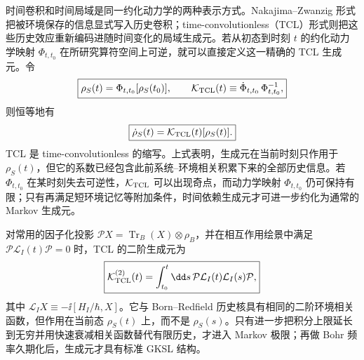 时间卷积和时间局域是同一约化动力学的两种表示方式。Nakajima--Zwanzig 形式把被环境保存的信息显式写入历史卷积；time-convolutionless（TCL）形式则把这些历史效应重新编码进随时间变化的局域生成元。若从初态到时刻 $t$ 的约化动力学映射 $\Phi_{t,t_0}$ 在所研究算符空间上可逆，就可以直接定义这一精确的 TCL 生成元。令
\begin{equation}
\boxed{
\rho_S(t)=\Phi_{t,t_0}[\rho_S(t_0)],
\qquad
\mathcal K_{\rm TCL}(t)
\equiv
\dot\Phi_{t,t_0}\,\Phi_{t,t_0}^{-1},}
\label{eq:exact_tcl_generator_definition}
\end{equation}
则恒等地有
\begin{equation}
\boxed{
\dot\rho_S(t)
=\mathcal K_{\rm TCL}(t)[\rho_S(t)].}
\label{eq:exact_tcl_master_equation}
\end{equation}
TCL 是 time-convolutionless 的缩写。上式表明，生成元在当前时刻只作用于 $\rho_S(t)$，但它的系数已经包含此前系统--环境相关积累下来的全部历史信息。若 $\Phi_{t,t_0}$ 在某时刻失去可逆性，$\mathcal K_{\rm TCL}$ 可以出现奇点，而动力学映射 $\Phi_{t,t_0}$ 仍可保持有限；只有再满足短环境记忆等附加条件，时间依赖生成元才可进一步约化为通常的 Markov 生成元。

对常用的因子化投影
$\mathcal P X=\operatorname{Tr}_B(X)\otimes\rho_B$，并在相互作用绘景中满足
$\mathcal P\mathcal L_I(t)\mathcal P=0$ 时，TCL 的二阶生成元为
\begin{equation}
\boxed{
\mathcal K_{\rm TCL}^{(2)}(t)
=\int_{t_0}^{t}\dd s\,
\mathcal P\mathcal L_I(t)\mathcal L_I(s)\mathcal P,}
\label{eq:tcl2_generator_projected_liouvillian}
\end{equation}
其中 $\mathcal L_I X\equiv-\ii[H_I/\hbar,X]$。它与 Born--Redfield 历史核具有相同的二阶环境相关函数，但作用在当前态 $\rho_S(t)$ 上，而不是 $\rho_S(s)$。只有进一步把积分上限延长到无穷并用快速衰减相关函数替代有限历史，才进入 Markov 极限；再做 Bohr 频率久期化后，生成元才具有标准 GKSL 结构。

